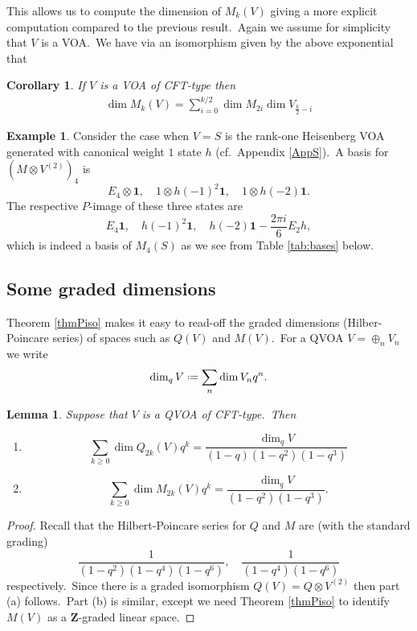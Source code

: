 \documentclass[12pt]{amsart}
\theoremstyle{plain}
\newtheorem{lem}[thm]{Lemma}
\newtheorem{cor}[thm]{Corollary}
\theoremstyle{definition}
\newtheorem{ex}[thm]{Example}
\theoremstyle{remark}
\newcommand*{\df}{\mathrel{\vcenter{\baselineskip0.5ex \lineskiplimit0pt
                     \hbox{\scriptsize.}\hbox{\scriptsize.}}} =}
\newcommand{\ZZ}{\mathbf{Z}}
\begin{document}
This allows us to compute the dimension of $M_k(V)$ giving a more explicit computation compared to the previous result.\ Again we assume for simplicity that $V$ is a VOA.\  We have via an isomorphism given by the above exponential that

\begin{cor}
If $V$ is a VOA of CFT-type then 
\begin{align*}
\dim M_k(V)=\sum_{i=0}^{k/2}\dim M_{2i}\dim V_{\frac{k}{2}-i}\end{align*}
\end{cor}

\begin{ex}
    Consider the case when $V=S$ is the rank-one Heisenberg VOA generated with canonical weight $1$ state $h$ (cf.\ 
    Appendix \ref{AppS}).\  A basis for $(M\otimes V^{(2)})_4$
is 
$$E_4\otimes \mathbf{1},\quad 1\otimes h(-1)^2\mathbf{1},\quad 1\otimes h(-2)\mathbf{1}.$$
The respective $P$-image of these three states are 
$$E_4\mathbf{1},\quad h(-1)^2\mathbf{1},\quad h(-2)\mathbf{1}-\frac{2\pi i}{6}E_2h,$$
which is indeed a basis of $M_4(S)$ as we see from Table \ref{tab:bases} below.
\end{ex} 

\subsection{Some graded dimensions}
Theorem \ref{thmPiso} makes it easy to read-off the graded dimensions (Hilber-Poincare series) of spaces such as $Q(V)$ and $M(V)$.\ For a QVOA $V=\oplus_n V_n$ we write
$$\dim_q V\df \sum_n \dim V_n q^n.$$

\begin{lem}\label{lemQM}
Suppose that $V$ is a QVOA of CFT-type.\ Then
\begin{enumerate}
    \item[(a)] \[\sum_{k\geq0} \dim Q_{2k}(V)q^k=\frac{\dim_qV}{(1-q)(1-q^2)(1-q^3)}\]
    \item[(b)] \[\sum_{k\geq0} \dim M_{2k}(V)q^k=\frac{\dim_qV}{(1-q^2)(1-q^3)}.\]
\end{enumerate}
\end{lem}
\begin{proof}
Recall that the Hilbert-Poincare series for $Q$ and $M$ are (with the standard grading)
$$\frac{1}{(1-q^2)(1-q^4)(1-q^6)},\quad \frac{1}{(1-q^4)(1-q^6)}$$
respectively.\ Since there is a graded isomorphism $Q(V)= Q\otimes V^{(2)}$ then part (a) follows.\ Part (b) is similar, except we need Theorem \ref{thmPiso} to identify $M(V)$ as a $\ZZ$-graded linear space.
\end{proof}
 
\end{document}
